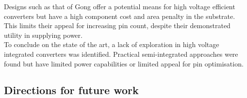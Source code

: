 \documentclass[letterpaper,twocolumn,10pt]{article}
\begin{document}
Designs such as that of Gong offer a potential means for high voltage efficient converters but have a high component cost and area penalty in the substrate. This limits their appeal for increasing pin count, despite their demonstrated utility in supplying power.\\       
\indent To conclude on the state of the art, a lack of exploration in high voltage integrated converters was identified. Practical semi-integrated approaches were found but have limited power capabilities or limited appeal for pin optimisation. 

\subsection{Directions for future work}
\end{document}
